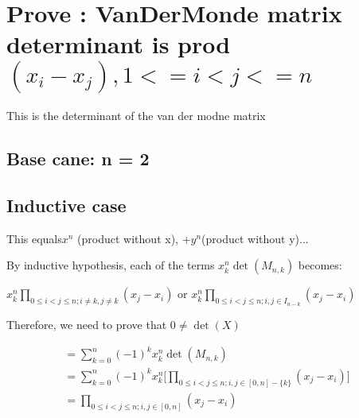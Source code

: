 \documentclass[11pt, oneside]{article} 	%
\begin{document}
\section{Prove : VanDerMonde matrix determinant is prod $(x_i - x_j), 1 <= i < j <= n$}
 This is the determinant of the van der modne matrix
\subsection{Base cane: n = 2}
\subsection{Inductive case} This equals$ x^n$ (product without x), +$ y^n $(product without y)...
\begin{comment}
- Represent as a graph tournament, n nodes, (n choose 2) edges.  There are 2^(n choose 2) possibilities.
- Each term (+/-) x_0^a_0*x_1^a_1...*x_n^a_n, where sum a_i = (n choose 2), represents one possible tournament on a directed complete graph of size n
- If there are no cycles in a given tournamnet
  - then it's of the form b^n c^n-1 ... x^1 y^0 for some b,c,...y in x_i.
- If there are ctycles in a tournament
  - Any even cycle implies an odd cycle (quick proof)
  - Therfore there's an odd cycle
  - Reversing an odd cycle produces a different graph with an odd cycle and flipped sign.
- For a tournament config that is NOT a topo sort (has a cycle)
  - There are as many positivies as negatives (PROVE?)
  - So the terms cancel out
  - Therefore everything is of the form b^n c^n-1 ... x^1 y^0
  - So big product up to n is x^n(prodcut without x) + y^n(product without y..).
*** This is zero if and only if x_i = x_j for some
*** Therefore, only one solution for n distinct points on a polynomial of size n.

\end{comment}


By inductive hypothesis, each of the terms $x_k^n\det(M_{n,k})$ becomes:

$x_k^n\prod_{0 \leq i < j \leq n; i \neq k, j \neq k} (x_j - x_i)$ 
or 
$x_k^n\prod_{0 \leq i < j \leq n; i, j \in I_{n-{k}}} (x_j - x_i)$ 


Therefore, we need to prove that $0 \neq \det(X)$

\begin{align}
= \sum_{k=0}^n (-1)^k x_k^n\det(M_{n, k}) \\
= \sum_{k=0}^n (-1)^k x_k^n\Big[\prod_{0 \leq i < j \leq n; i, j \in [0,n] - \{k\}} (x_j - x_i) \Big] \\
=\prod_{0 \leq i < j \leq n; i, j \in [0,n]} (x_j - x_i) 
\end{align}
\end{document}
